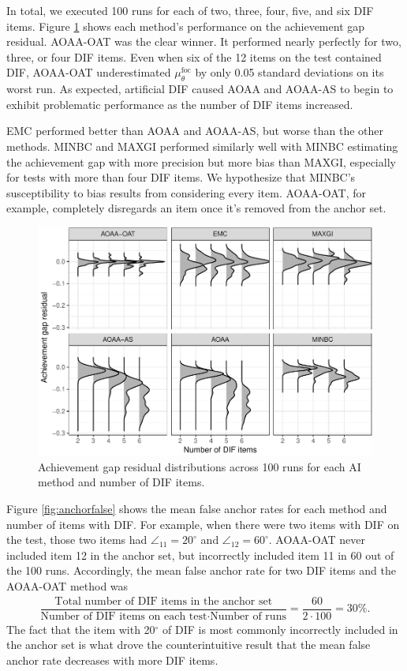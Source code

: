 \documentclass[
  11pt,
]{article}
\begin{document}
In total, we executed 100 runs for each of two, three, four, five, and six DIF items. Figure \ref{fig:achievegap} shows each method's performance on the achievement gap residual. AOAA-OAT was the clear winner. It performed nearly perfectly for two, three, or four DIF items. Even when six of the 12 items on the test contained DIF, AOAA-OAT underestimated \(\mu_\theta^\text{foc}\) by only 0.05 standard deviations on its worst run. As expected, artificial DIF caused AOAA and AOAA-AS to begin to exhibit problematic performance as the number of DIF items increased.

EMC performed better than AOAA and AOAA-AS, but worse than the other methods. MINBC and MAXGI performed similarly well with MINBC estimating the achievement gap with more precision but more bias than MAXGI, especially for tests with more than four DIF items. We hypothesize that MINBC's susceptibility to bias results from considering every item. AOAA-OAT, for example, completely disregards an item once it's removed from the anchor set.

\begin{figure}[H]

{\centering \includegraphics[width=0.7\linewidth]{paper_files/figure-latex/achievegap-1} 

}

\caption{Achievement gap residual distributions across 100 runs for each AI method and number of DIF items.}\label{fig:achievegap}
\end{figure}

Figure \ref{fig:anchorfalse} shows the mean false anchor rates for each method and number of items with DIF. For example, when there were two items with DIF on the test, those two items had \(\angle_{11} = 20^\circ\) and \(\angle_{12} = 60^\circ\). AOAA-OAT never included item 12 in the anchor set, but incorrectly included item 11 in 60 out of the 100 runs. Accordingly, the mean false anchor rate for two DIF items and the AOAA-OAT method was
\begin{align}
\dfrac{\text{Total number of DIF items in the anchor set}}{\text{Number of DIF items on each test} \cdot \text{Number of runs}} = \dfrac{60}{2 \cdot 100} = 30\%.
\end{align}
The fact that the item with 20\(^\circ\) of DIF is most commonly incorrectly included in the anchor set is what drove the counterintuitive result that the mean false anchor rate decreases with more DIF items.
\end{document}

